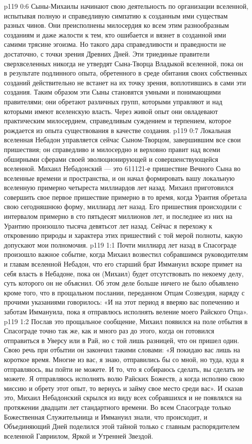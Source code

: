 \vs p119 0:6 Сыны\hyp{}Михаилы начинают свою деятельность по организации вселенной, испытывая полную и справедливую симпатию к созданным ими существам разных чинов. Они преисполнены милосердия ко всем этим разнообразным созданиям и даже жалости к тем, кто ошибается и вязнет в созданной ими самими трясине эгоизма. Но такого дара справедливости и праведности не достаточно, с точки зрения Древних Дней. Эти триединые правители сверхвселенных никогда не утвердят Сына\hyp{}Творца Владыкой вселенной, пока он в результате подлинного опыта, обретенного в среде обитания своих собственных созданий действительно не встанет на их точку зрения, воплотившись в сами эти создания. Таким образом эти Сыны становятся умными и понимающими правителями; они обретают  различных групп, которыми управляют и над которыми имеют вселенскую власть. Через живой опыт они овладевают практическим милосердием, справедливым суждением и терпением, которое рождается из опыта существования в качестве создания.
\vs p119 0:7 \pc Локальная вселенная Небадон управляется сейчас Сыном\hyp{}Творцом, завершившим все свои пришествия; он справедливо и милосердно и верховно правит над всеми обширными сферами своей эволюционирующей и совершенствующейся вселенной. Михаил Небадонский --- это 611121\hyp{}е пришествие Вечного Сына во вселенные времени и пространства, и он начал формировать вашу локальную вселенную примерно четыреста миллиардов лет назад. Михаил приготовился совершить свое первое пришествие примерно в то время, когда Урантия обретала свою сегодняшнюю форму, миллиард лет назад. Его пришествия происходили с интервалом примерно в сто пятьдесят миллионов лет, и последнее из них на Урантию произошло тысяча девятьсот лет назад. Сейчас я перехожу к откровению природы и характера этих пришествий с той мерой полноты, какую допускают мои полномочия.
\vs p119 1:1 Почти миллиард лет назад в Спасограде произошло важное событие, когда Михаил возвестил собравшимся руководителям и главам вселенной Небадон, что его старший брат Иммануил вскоре примет на себя власть в Небадоне, пока он (Михаил) будет отсутствовать по некоему делу, суть которого он не объяснил. Об этом деле больше ничего не было объявлено кроме того, что в прощальном послании, переданном Отцам Созвездия, наряду с прочими указаниями говорилось: «И на этот период я вверяю вас попечению и заботам Иммануила, пока я отправлюсь исполнять веление моего Райского Отца».
\vs p119 1:2 Послав это прощальное сообщение, Михаил появился на поле отбытия в Спасограде точно так же, как и много раз до этого, когда он готовился отправиться в Уверсу или в Рай, но с той лишь разницей, что он пришел один. Свою речь при отбытии он закончил такими словами: «Я покидаю вас лишь на короткое время. Многие из вас, я знаю, отправились бы со мной, но туда, куда я отправляюсь, вы пойти не можете. И то, что я собираюсь сделать, вы сделать не можете. Я отправляюсь исполнять волю Райских Божеств, а когда исполню свою миссию и обрету этот опыт, то вернусь и займу свое место среди вас». И сказав это, Михаил Небадонский скрылся из виду всех собравшихся и не появлялся на протяжении двадцати лет стандартного времени. Во всем Спасограде только Божественная Служительница и Иммануил знали, что происходит, и Объединяющий Дней поделился этой тайной только с главным распорядителем вселенной Гавриилом, Яркой и Утренней Звездой.
